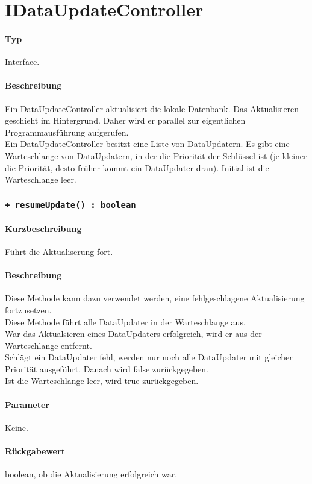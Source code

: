 \section{IDataUpdateController}
\paragraph*{Typ}
Interface.
\paragraph*{Beschreibung}
Ein DataUpdateController aktualisiert die lokale Datenbank. Das Aktualisieren geschieht im 
Hintergrund. Daher wird er parallel zur eigentlichen Programmausführung aufgerufen.\\
Ein DataUpdateController besitzt eine Liste von DataUpdatern.
Es gibt eine Warteschlange von DataUpdatern, in der die Priorität der Schlüssel ist (je kleiner 
die Priorität, desto früher kommt ein DataUpdater dran). Initial ist die Warteschlange leer.\\


\subsubsection{\texttt{+ resumeUpdate() : boolean}}%
\paragraph*{Kurzbeschreibung}
Führt die Aktualiserung fort.
\paragraph*{Beschreibung}
Diese Methode kann dazu verwendet werden, eine fehlgeschlagene Aktualisierung fortzusetzen.\\
Diese Methode führt alle DataUpdater in der Warteschlange aus.\\
War das Aktualsieren eines DataUpdaters erfolgreich, wird er aus der Warteschlange entfernt.\\
Schlägt ein DataUpdater fehl, werden nur noch alle DataUpdater mit gleicher Priorität 
ausgeführt. Danach wird false zurückgegeben.\\
Ist die Warteschlange leer, wird true zurückgegeben.\\
\paragraph*{Parameter}
Keine.
\paragraph*{Rückgabewert}
boolean, ob die Aktualisierung erfolgreich war.

